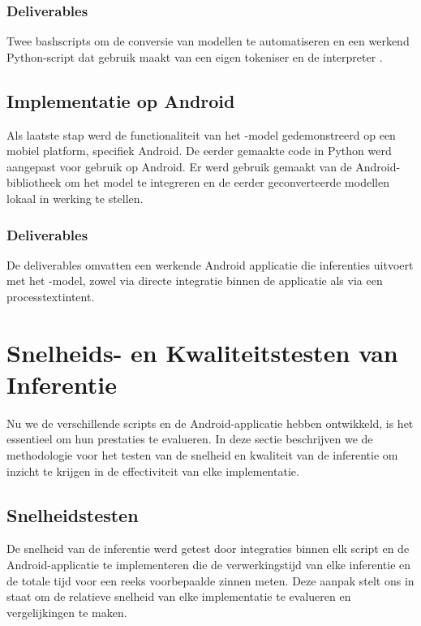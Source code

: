 \subsubsection{Deliverables}
Twee bashscripts om de conversie van modellen te automatiseren en een werkend Python-script dat gebruik maakt van een eigen tokeniser en de  interpreter .

\subsection{Implementatie op Android}

Als laatste stap werd de functionaliteit van het -model gedemonstreerd op een mobiel platform, specifiek Android. De eerder gemaakte code in Python werd aangepast voor gebruik op Android. Er werd gebruik gemaakt van de  Android-bibliotheek om het model te integreren en de eerder geconverteerde modellen lokaal in werking te stellen.

\subsubsection{Deliverables}
De deliverables omvatten een werkende Android applicatie die inferenties uitvoert met het -model, zowel via directe integratie binnen de applicatie als via een \gls{processtextintent}.

\section{Snelheids- en Kwaliteitstesten van Inferentie}

Nu we de verschillende scripts en de Android-applicatie hebben ontwikkeld, is het essentieel om hun prestaties te evalueren. In deze sectie beschrijven we de methodologie voor het testen van de snelheid en kwaliteit van de inferentie om inzicht te krijgen in de effectiviteit van elke implementatie.

\subsection{Snelheidstesten}

De snelheid van de inferentie werd getest door integraties binnen elk script en de Android-applicatie te implementeren die de verwerkingstijd van elke inferentie en de totale tijd voor een reeks voorbepaalde zinnen meten. Deze aanpak stelt ons in staat om de relatieve snelheid van elke implementatie te evalueren en vergelijkingen te maken.

